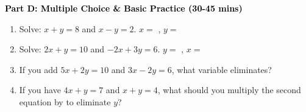 \documentclass[12pt, letterpaper, fleqn]{article}
\newcommand{\blank}{\underline{\hspace{2.2cm}}}
\begin{document}
\newpage

\begin{tcolorbox}[colback=customteal!20]
\large\textcolor{black}{\textbf{Part D: Multiple Choice \& Basic Practice (30-45 mins)}}
\end{tcolorbox}

\vspace{3mm}

\begin{enumerate}[itemsep=2.5cm, leftmargin=0.6cm, resume]
\item Solve: $x + y = 8$ and $x - y = 2$. $x=$ \blank, $y=$ \blank
\item Solve: $2x + y = 10$ and $-2x + 3y = 6$. $y=$ \blank, $x=$ \blank
\item If you add $5x + 2y = 10$ and $3x - 2y = 6$, what variable eliminates? \blank
\item If you have $4x + y = 7$ and $x + y = 4$, what should you multiply the second equation by to eliminate $y$? \blank
\end{enumerate}
\end{document}

